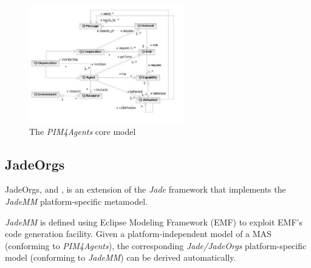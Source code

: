 \begin{figure}[ht]
	\centering
	\includegraphics[width=0.6\textwidth]{images/pim4agents/pim4agents-metamodel.png}
	\caption{The \textit{PIM4Agents} core model \cite{Hahn07b}}
	\label{figure:pim4agents-metamodel}
\end{figure}

\subsection{JadeOrgs}

JadeOrgs, \cite{Madrigal-Mora08} and \cite{Madrigal-Mora09}, is an extension of the \textit{Jade} framework that implements the \textit{JadeMM} platform-specific metamodel.

\textit{JadeMM} is defined using Eclipse Modeling Framework (EMF) to exploit EMF's code generation facility.
Given a platform-independent model of a MAS (conforming to \textit{PIM4Agents}), the corresponding \textit{Jade/JadeOrgs} platform-specific model (conforming to \textit{JadeMM}) can be derived automatically.